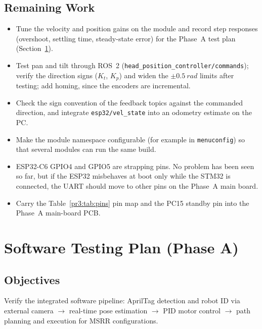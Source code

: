 \documentclass[12pt,a4paper]{article}
\begin{document}
\subsection{Remaining Work}

\begin{itemize}
  \item Tune the velocity and position gains on the module and record step responses
        (overshoot, settling time, steady-state error) for the Phase~A test plan (Section~\ref{sec:software-testing}).
  \item Test pan and tilt through ROS~2 (\texttt{head\_position\_controller/commands}); verify the direction signs ($K_t$, $K_p$) and widen the $\pm\SI{0.5}{rad}$
        limits after testing; add homing, since the encoders are incremental.
  \item Check the sign convention of the feedback topics against the commanded direction,
        and integrate \texttt{esp32/vel\_state} into an odometry estimate on the PC.
  \item Make the module namespace configurable (for example in \texttt{menuconfig}) so that
        several modules can run the same build.
  \item ESP32-C6 GPIO4 and GPIO5 are strapping pins. No problem has been seen so far, but if the
        ESP32 misbehaves at boot only while the STM32 is connected, the UART should move to
        other pins on the Phase~A main board.
  \item Carry the Table~\ref{pr3:tab:pins} pin map and the PC15 standby pin into the Phase~A
        main-board PCB.
\end{itemize}

\clearpage
\section{Software Testing Plan (Phase A)}
\label{sec:software-testing}

\subsection{Objectives}

Verify the integrated software pipeline: AprilTag detection and robot ID via external camera $\rightarrow$ real-time pose estimation $\rightarrow$ PID motor control $\rightarrow$ path planning and execution for MSRR configurations.
\end{document}
